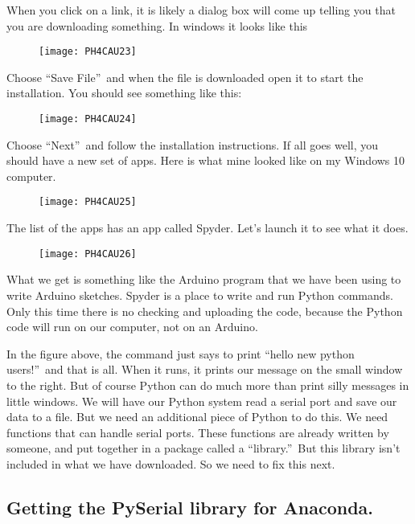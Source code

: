When you click on a link, it is likely a dialog box will come up telling you
that you are downloading something. In windows it looks like this \begin{figure}[h!]
\texttt{[image: PH4CAU23]}
\end{figure}

Choose \textquotedblleft Save File\textquotedblright\ and when the file is
downloaded open it to start the installation. You should see something like
this: \begin{figure}[h!]
\texttt{[image: PH4CAU24]}
\end{figure}

Choose \textquotedblleft Next\textquotedblright\ and follow the installation
instructions. If all goes well, you should have a new set of apps. Here is
what mine looked like on my Windows 10 computer. \begin{figure}[h!]
\texttt{[image: PH4CAU25]}
\end{figure}

The list of the apps has an app called Spyder. Let's launch it to see what
it does.\begin{figure}[h!]
\texttt{[image: PH4CAU26]}
\end{figure}

What we get is something like the Arduino program that we have been using to
write Arduino sketches. Spyder is a place to write and run Python commands.
Only this time there is no checking and uploading the code, because the
Python code will run on our computer, not on an Arduino.

In the figure above, the command just says to print \textquotedblleft hello
new python users!\textquotedblright\ and that is all. When it runs, it
prints our message on the small window to the right. But of course Python
can do much more than print silly messages in little windows. We will have
our Python system read a serial port and save our data to a file. But we
need an additional piece of Python to do this. We need functions that can
handle serial ports. These functions are already written by someone, and put
together in a package called a \textquotedblleft library.\textquotedblright\
But this library isn't included in what we have downloaded. So we need to
fix this next.

\subsection{Getting the PySerial library for Anaconda.}

